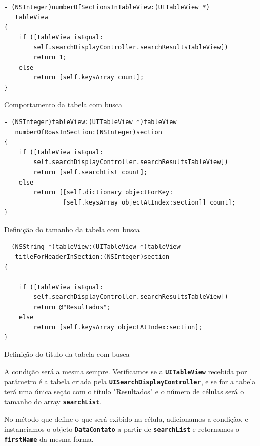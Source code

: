 \documentclass[a4paper,12pt,brazil,doubleside]{book}
\begin{document}
\begin{singlespace}
\begin{listing}[H]
\begin{verbatim}
- (NSInteger)numberOfSectionsInTableView:(UITableView *)
   tableView
{
    if ([tableView isEqual:
        self.searchDisplayController.searchResultsTableView])
        return 1;
    else
        return [self.keysArray count];
}
\end{verbatim}
\caption{Comportamento da tabela com busca}
\end{listing}

\begin{listing}[H]
\begin{verbatim}
- (NSInteger)tableView:(UITableView *)tableView
   numberOfRowsInSection:(NSInteger)section
{
    if ([tableView isEqual:
        self.searchDisplayController.searchResultsTableView])
        return [self.searchList count];
    else
        return [[self.dictionary objectForKey:
                [self.keysArray objectAtIndex:section]] count];
}
\end{verbatim}
\caption{Definição do tamanho da tabela com busca}
\end{listing}

\begin{listing}[H]
\begin{verbatim}
- (NSString *)tableView:(UITableView *)tableView
   titleForHeaderInSection:(NSInteger)section
{
    
    if ([tableView isEqual:
        self.searchDisplayController.searchResultsTableView])
        return @"Resultados";
    else
        return [self.keysArray objectAtIndex:section];
}
\end{verbatim}
\caption{Definição do título da tabela com busca}
\end{listing}


A condição será a mesma sempre. Verificamos se a \texttt{\textbf{UITableView}} recebida por parâmetro é a tabela criada pela \texttt{\textbf{UISearchDisplayController}}, e se for a tabela terá uma única seção com o título "Resultados" e o número de células será o tamanho do array \texttt{\textbf{searchList}}.

No método que define o que será exibido na célula, adicionamos a condição, e instanciamos o objeto \texttt{\textbf{DataContato}} a partir de \texttt{\textbf{searchList}} e retornamos o \texttt{\textbf{firstName}} da mesma forma.


\end{singlespace}
\end{document}
